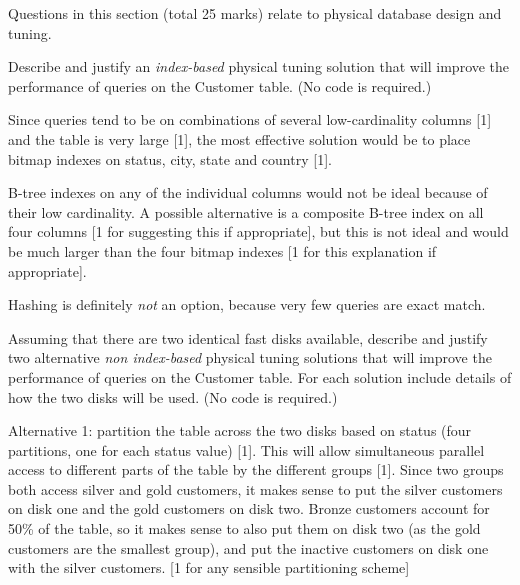 \begin{examsection}{25}{}{Questions in this section (total 25 marks) relate to
physical database design and tuning.}
\begin{question}{10}
\begin{itemize}
	\end{itemize}
	\medskip


	\begin{subquestion}{3}
		Describe and justify an \emph{index-based} physical tuning solution
		that will improve the performance of queries on the \textsf{Customer}
		table. (No code is required.)
		\begin{marking}
			Since queries tend to be on combinations of several low-cardinality
			columns [1] and the table is very large [1], the most effective
			solution would be to place bitmap indexes on status, city, state
			and country [1].

			B-tree indexes on any of the individual columns would not be ideal
			because of their low cardinality. A possible alternative is a
			composite B-tree index on all four columns [1 for suggesting this
			if appropriate], but this is not ideal and would be much larger
			than the four bitmap indexes [1 for this explanation if
			appropriate].

			Hashing is definitely \emph{not} an option, because very few
			queries are exact match.
		\end{marking}
	\end{subquestion}
		

	\begin{subquestion}{7}
		\begin{subsubquestion}{5}
			\label{nonindex}
			Assuming that there are two identical fast disks available,
			describe and justify two alternative \emph{non index-based}
			physical tuning solutions that will improve the performance of
			queries on the \textsf{Customer} table. For each solution include
			details of how the two disks will be used. (No code is required.)
			\begin{marking}
				Alternative 1: partition the table across the two disks based
				on status (four partitions, one for each status value) [1].
				This will allow simultaneous parallel access to different parts
				of the table by the different groups [1]. Since two groups both
				access silver and gold customers, it makes sense to put the
				silver customers on disk one and the gold customers on disk
				two. Bronze customers account for 50\% of the table, so it
				makes sense to also put them on disk two (as the gold customers
				are the smallest group), and put the inactive customers on disk
				one with the silver customers. [1 for any sensible partitioning
				scheme]
	

\end{marking}
\end{subsubquestion}
\end{subquestion}
\end{question}
\end{examsection}
